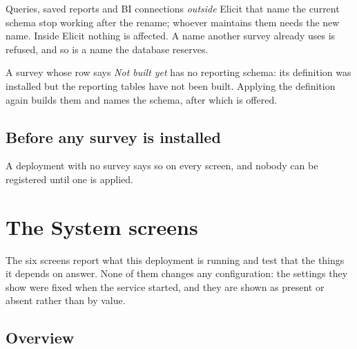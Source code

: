 \documentclass[11pt, a4paper]{article}
\newcommand{\adminonly}{%
  \marginpar{\raggedright\footnotesize\textcolor{elicitVerdigris}{\textsf{Administrator}}}%
}
\begin{document}

\begin{elicitcaution}
Queries, saved reports and BI connections \emph{outside} Elicit that name the current schema
stop working after the rename; whoever maintains them needs the new name. Inside Elicit nothing
is affected. A name another survey already uses is refused, and so is a name the database
reserves.
\end{elicitcaution}

A survey whose row says \emph{Not built yet} has no reporting schema: its definition was
installed but the reporting tables have not been built. Applying the definition again builds
them and names the schema, after which  is offered.

\subsection{Before any survey is installed}

A deployment with no survey says so on every screen, and nobody can be registered until one is
applied.


\section{The System screens}\adminonly
\label{sec:system}

The six  screens report what this deployment is running and test that the things it
depends on answer. None of them changes any configuration: the settings they show were fixed
when the service started, and they are shown as present or absent rather than by value.

\subsection{Overview}

\end{document}
